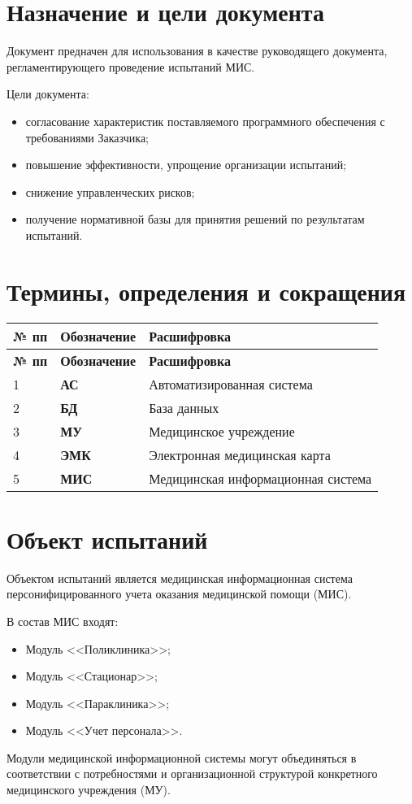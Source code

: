 \newpage
\section{Назначение и цели документа}
Документ предначен для использования в качестве руководящего документа, регламентирующего проведение испытаний МИС. 

Цели документа:
\begin{itemize}
\item согласование характеристик поставляемого программного обеспечения с требованиями Заказчика;
\item повышение эффективности, упрощение организации испытаний;
\item снижение управленческих рисков;
\item получение нормативной базы для принятия решений по результатам испытаний.
\end{itemize}

\section{Термины, определения и сокращения}
\begin{longtable}{|p{1cm}|p{5cm}|p{10.5cm}|}
\hline \rule{0pt}{15pt} \centering \textbf{№ пп} & \centering \textbf{Обозначение} & \hfil \textbf{Расшифровка} \\ \hline
\endfirsthead
\hline \rule{0pt}{15pt} \centering \textbf{№ пп} & \centering \textbf{Обозначение} & \hfil \textbf{Расшифровка} \\
\endhead
1 & \textbf{АС} & Автоматизированная система \\ \hline
2 & \textbf{БД} & База данных \\ \hline
3 & \textbf{МУ} & Медицинское учреждение \\ \hline
4 & \textbf{ЭМК} & Электронная медицинская карта\\ \hline
5 & \textbf{МИС} & Медицинская информационная система\\ \hline
\end{longtable}

\section{Объект испытаний}
Объектом испытаний является медицинская информационная система персонифицированного учета оказания медицинской помощи (МИС).

В состав МИС входят:
\begin{itemize}
\item Модуль <<Поликлиника>>; 
\item Модуль <<Стационар>>; 
\item Модуль <<Параклиника>>;
\item Модуль <<Учет персонала>>.
\end{itemize}
Модули медицинской информационной системы могут объединяться в соответствии с потребностями и организационной структурой конкретного  медицинского учреждения (МУ). 

